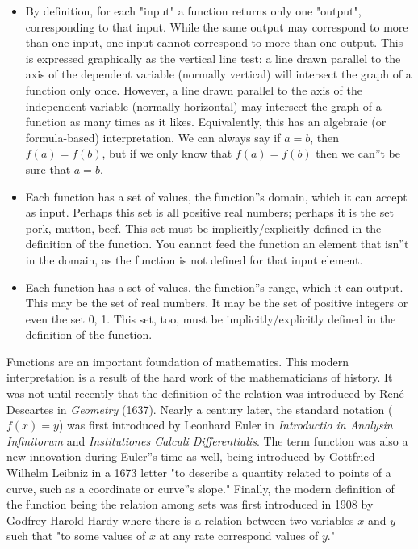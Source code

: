 \begin{itemize}
    \item By definition, for each "input" a function returns only one "output", corresponding to that input. While the same output may correspond to more than one input, one input cannot correspond to more than one output. This is expressed graphically as the vertical line test: a line drawn parallel to the axis of the dependent variable (normally vertical) will intersect the graph of a function only once. However, a line drawn parallel to the axis of the independent variable (normally horizontal) may intersect the graph of a function as many times as it likes. Equivalently, this has an algebraic (or formula-based) interpretation. We can always say if $a = b$, then $f(a) = f(b)$, but if we only know that $f(a) = f(b)$ then we can''t be sure that $a = b$.
    \item Each function has a set of values, the function''s domain, which it can accept as input. Perhaps this set is all positive real numbers; perhaps it is the set {pork, mutton, beef}. This set must be implicitly/explicitly defined in the definition of the function. You cannot feed the function an element that isn''t in the domain, as the function is not defined for that input element.
    \item Each function has a set of values, the function''s range, which it can output. This may be the set of real numbers. It may be the set of positive integers or even the set {0, 1}. This set, too, must be implicitly/explicitly defined in the definition of the function.
\end{itemize}

Functions are an important foundation of mathematics. This modern interpretation is a result of the hard work of the mathematicians of history. It was not until recently that the definition of the relation was introduced by René Descartes in \textit{Geometry} (1637). Nearly a century later, the standard notation ($f(x) = y$) was first introduced by Leonhard Euler in \textit{Introductio in Analysin Infinitorum} and \textit{Institutiones Calculi Differentialis}. The term function was also a new innovation during Euler''s time as well, being introduced by Gottfried Wilhelm Leibniz in a 1673 letter "to describe a quantity related to points of a curve, such as a coordinate or curve''s slope." Finally, the modern definition of the function being the relation among sets was first introduced in 1908 by Godfrey Harold Hardy where there is a relation between two variables $x$ and $y$ such that "to some values of $x$ at any rate correspond values of $y$."

